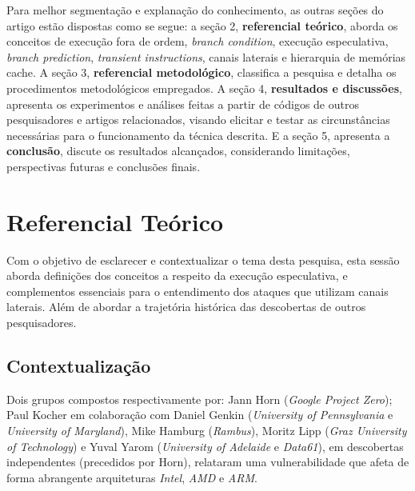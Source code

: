 \documentclass[
	article,			    %
	12pt,				    %
	oneside,			    %
	a4paper,			    %
	chapter=TITLE,		    %
	section=TITLE,		    %
	subsection=TITLE,	    %
	english,			    %
	brazil,				    %
	sumario=tradicional
]{abntex2}
\begin{document}
Para melhor segmentação e explanação do conhecimento, as outras seções do artigo estão dispostas como se segue: a seção 2, \textbf{referencial teórico}, aborda os conceitos de execução fora de ordem, \emph{branch condition}, execução especulativa, \emph{branch prediction}, \emph{transient instructions}, canais laterais e hierarquia de memórias cache. A seção 3, \textbf{referencial metodológico}, classifica a pesquisa e detalha os procedimentos metodológicos empregados. A seção 4, \textbf{resultados e discussões}, apresenta os experimentos e análises feitas a partir de códigos de outros pesquisadores e artigos relacionados, visando elicitar e testar as circunstâncias necessárias para o funcionamento da técnica descrita. E a seção 5, apresenta a \textbf{conclusão}, discute os resultados alcançados, considerando limitações, perspectivas futuras e conclusões finais.

\section{Referencial Teórico}
Com o objetivo de esclarecer e contextualizar o tema desta pesquisa, esta sessão aborda definições dos conceitos a respeito da execução especulativa, e complementos essenciais para o entendimento dos ataques que utilizam canais laterais. Além de abordar a trajetória histórica das descobertas de outros pesquisadores.

\subsection{Contextualização}
Dois grupos compostos respectivamente por: Jann Horn (\emph{Google Project Zero}); Paul Kocher em colaboração com Daniel Genkin (\emph{University of Pennsylvania} e \emph{University of Maryland}), Mike Hamburg (\emph{Rambus}), Moritz Lipp (\emph{Graz University of Technology}) e Yuval Yarom (\emph{University of Adelaide} e \emph{Data61}), em descobertas independentes (precedidos por Horn), relataram uma vulnerabilidade que afeta de forma abrangente arquiteturas \emph{Intel}, \emph{AMD} e \emph{ARM}.
\end{document}
